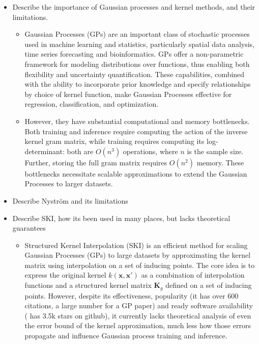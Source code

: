 

\begin{itemize}
    \item Describe the importance of Gaussian processes and kernel methods, and their limitations.
    \begin{itemize}
        \item Gaussian Processes (GPs) are an important class of stochastic processes used in machine learning and statistics, particularly spatial data analysis, time series forecasting and bioinformatics. GPs offer a non-parametric framework for modeling distributions over functions, thus enabling both flexibility and uncertainty quantification. These capabilities, combined with the ability to incorporate prior knowledge and specify relationships by choice of kernel function, make Gaussian Processes effective for regression, classification, and optimization.
        \item However, they have substantial computational and memory bottlenecks. Both training and inference require computing the action of the inverse kernel gram matrix, while training requires computing its log-determinant: both are $O(n^3)$ operations, where $n$ is the sample size. Further, storing the full gram matrix requires $O(n^2)$ memory. These bottlenecks necessitate scalable approximations to extend the Gaussian Processes to larger datasets.
    \end{itemize}
    \item Describe Nystr{\"o}m and its limitations
    \item Describe SKI, how its been used in many places, but lacks theoretical guarantees
    \begin{itemize}
        \item Structured Kernel Interpolation (SKI) is an efficient method for scaling Gaussian Processes (GPs) to large datasets by approximating the kernel matrix using interpolation on a set of inducing points. The core idea is to express the original kernel \( k(\mathbf{x}, \mathbf{x}') \) as a combination of interpolation functions and a structured kernel matrix \( \mathbf{K}_g \) defined on a set of inducing points. However, despite its effectiveness, popularity (it has over $600$ citations, a large number for a GP paper) and ready software availability (\cite{gardner2018gpytorch} has 3.5k stars on github), it currently lacks theoretical analysis of even the error bound of the kernel approximation, much less how those errors propagate and influence Gaussian process training and inference.

\end{itemize}
\end{itemize}

